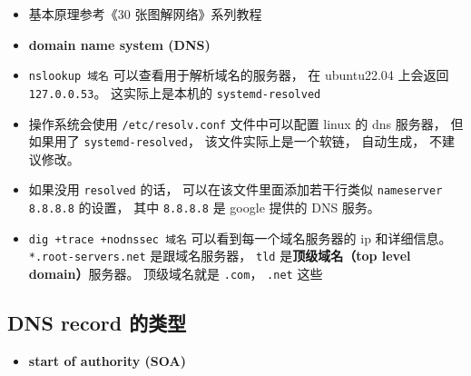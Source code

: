 
\begin{itemize}
\item 基本原理参考《30 张图解网络》系列教程
\item \textbf{domain name system (DNS)}
\item \verb|nslookup 域名| 可以查看用于解析域名的服务器， 在 ubuntu22.04 上会返回 \verb|127.0.0.53|。 这实际上是本机的 \verb|systemd-resolved|
\item 操作系统会使用 \verb|/etc/resolv.conf| 文件中可以配置 linux 的 dns 服务器， 但如果用了 \verb|systemd-resolved|， 该文件实际上是一个软链， 自动生成， 不建议修改。
\item 如果没用 \verb|resolved| 的话， 可以在该文件里面添加若干行类似 \verb|nameserver 8.8.8.8| 的设置， 其中 \verb|8.8.8.8| 是 google 提供的 DNS 服务。
\item \verb|dig +trace +nodnssec 域名| 可以看到每一个域名服务器的 ip 和详细信息。 \verb|*.root-servers.net| 是跟域名服务器， \verb|tld| 是\textbf{顶级域名（top level domain）}服务器。 顶级域名就是 \verb|.com|， \verb|.net| 这些
\end{itemize}

\subsection{DNS record 的类型}
\begin{itemize}
\item \textbf{start of authority (SOA)}
\end{itemize}
